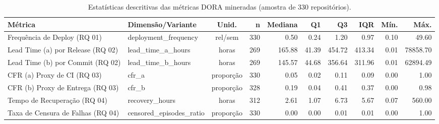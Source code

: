 \begin{table}[ht]
\centering
\caption{Estatísticas descritivas das métricas DORA mineradas (amostra de 330 repositórios).}
\label{tab:metricas_dora_descritiva}
\small
\begin{tabular}{llcrrrrrrr}
\toprule
\textbf{Métrica} & \textbf{Dimensão/Variante} & \textbf{Unid.} & \textbf{n} & \textbf{Mediana} & \textbf{Q1} & \textbf{Q3} & \textbf{IQR} & \textbf{Mín.} & \textbf{Máx.} \\
\midrule
Frequência de Deploy (RQ 01) & deployment_frequency & rel/sem & 330 & 0.50 & 0.24 & 1.20 & 0.97 & 0.10 & 49.60 \\
Lead Time (a) por Release (RQ 02) & lead_time_a_hours & horas & 269 & 165.88 & 41.39 & 454.72 & 413.34 & 0.01 & 78858.70 \\
Lead Time (b) por Commit (RQ 02) & lead_time_b_hours & horas & 269 & 145.57 & 44.68 & 356.64 & 311.96 & 0.01 & 62894.49 \\
CFR (a) Proxy de CI (RQ 03) & cfr_a & proporção & 330 & 0.05 & 0.02 & 0.11 & 0.09 & 0.00 & 1.00 \\
CFR (b) Proxy de Entrega (RQ 03) & cfr_b & proporção & 328 & 0.19 & 0.04 & 0.41 & 0.37 & 0.00 & 0.98 \\
Tempo de Recuperação (RQ 04) & recovery_hours & horas & 312 & 2.61 & 1.07 & 6.73 & 5.67 & 0.07 & 560.00 \\
Taxa de Censura de Falhas (RQ 04) & censored_episodes_ratio & proporção & 330 & 0.00 & 0.00 & 0.01 & 0.01 & 0.00 & 1.00 \\
\bottomrule
\end{tabular}
\end{table}
